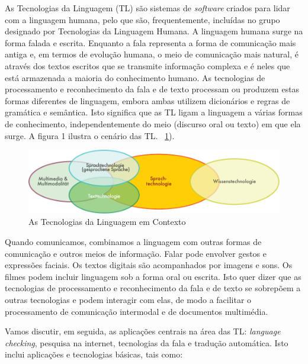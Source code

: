 \begin{multicols}{2}

  As Tecnologias da Linguagem (TL) são sistemas de \textit{software} criados para lidar com a linguagem humana, pelo que são, frequentemente, incluídas no grupo designado por Tecnologias da Linguagem Humana. A linguagem humana surge na forma falada e escrita. Enquanto a fala representa a forma de comunicação mais antiga e, em termos de evolução humana, o meio de comunicação mais natural, é através dos textos escritos que se transmite informação complexa e é neles que está armazenada a maioria do conhecimento humano. As tecnologias de processamento e reconhecimento da fala e de texto processam ou produzem estas formas diferentes de linguagem, embora ambas utilizem dicionários e regras de gramática e semântica. Isto significa que as TL ligam a linguagem a várias formas de conhecimento, independentemente do meio (discurso oral ou texto) em que ela surge. A figura 1 ilustra o cenário das TL. ~\ref{fig:ltincontext_de}).

\begin{figure}[htb]
  \center
  \includegraphics[width=\textwidth]{../_media/german/language_technologies}
  \caption{As Tecnologias da Linguagem em Contexto}
  \label{fig:ltincontext_de}
\end{figure}

Quando comunicamos, combinamos a linguagem com outras formas de comunicação e outros meios de informação. Falar pode envolver gestos e expressões faciais. Os textos digitais são acompanhados por imagens e sons. Os filmes podem incluir linguagem sob a forma oral ou escrita. Isto quer dizer que as tecnologias de processamento e reconhecimento da fala e de texto se sobrepõem a outras tecnologias e podem interagir com elas, de modo a facilitar o processamento de comunicação intermodal e de documentos multimédia.

Vamos discutir, em seguida, as aplicações centrais na área das TL: \textit{language checking}, pesquisa na internet, tecnologias da fala e tradução automática. Isto inclui aplicações e tecnologias básicas, tais como:


\end{multicols}
